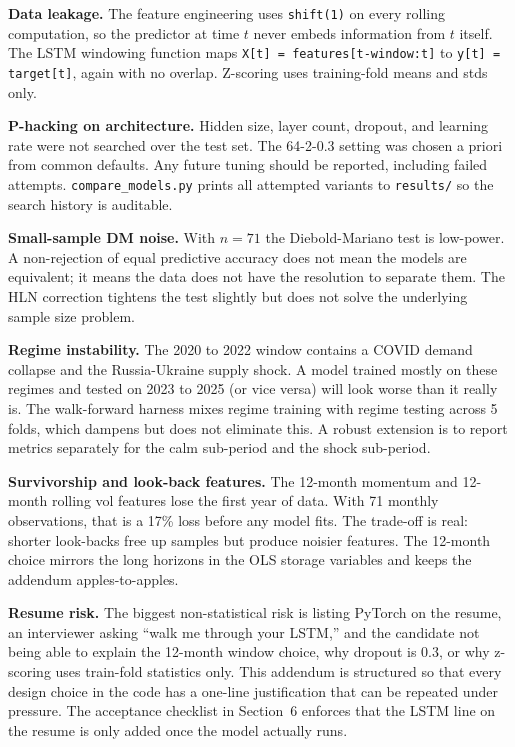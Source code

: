 \documentclass[11pt,letterpaper]{article}
\begin{document}
\textbf{Data leakage.} The feature engineering uses \texttt{shift(1)} on every rolling computation, so the predictor at time $t$ never embeds information from $t$ itself. The LSTM windowing function maps \texttt{X[t] = features[t-window:t]} to \texttt{y[t] = target[t]}, again with no overlap. Z-scoring uses training-fold means and stds only.

\textbf{P-hacking on architecture.} Hidden size, layer count, dropout, and learning rate were not searched over the test set. The 64-2-0.3 setting was chosen a priori from common defaults. Any future tuning should be reported, including failed attempts. \texttt{compare\_models.py} prints all attempted variants to \texttt{results/} so the search history is auditable.

\textbf{Small-sample DM noise.} With $n=71$ the Diebold-Mariano test is low-power. A non-rejection of equal predictive accuracy does not mean the models are equivalent; it means the data does not have the resolution to separate them. The HLN correction tightens the test slightly but does not solve the underlying sample size problem.

\textbf{Regime instability.} The 2020 to 2022 window contains a COVID demand collapse and the Russia-Ukraine supply shock. A model trained mostly on these regimes and tested on 2023 to 2025 (or vice versa) will look worse than it really is. The walk-forward harness mixes regime training with regime testing across 5 folds, which dampens but does not eliminate this. A robust extension is to report metrics separately for the calm sub-period and the shock sub-period.

\textbf{Survivorship and look-back features.} The 12-month momentum and 12-month rolling vol features lose the first year of data. With 71 monthly observations, that is a 17\% loss before any model fits. The trade-off is real: shorter look-backs free up samples but produce noisier features. The 12-month choice mirrors the long horizons in the OLS storage variables and keeps the addendum apples-to-apples.

\textbf{Resume risk.} The biggest non-statistical risk is listing PyTorch on the resume, an interviewer asking ``walk me through your LSTM,'' and the candidate not being able to explain the 12-month window choice, why dropout is 0.3, or why z-scoring uses train-fold statistics only. This addendum is structured so that every design choice in the code has a one-line justification that can be repeated under pressure. The acceptance checklist in Section~6 enforces that the LSTM line on the resume is only added once the model actually runs.
\end{document}
